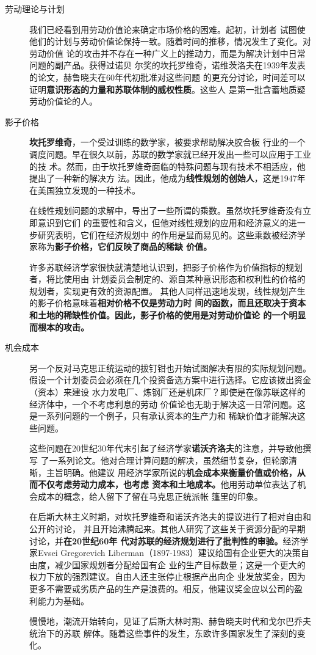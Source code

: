 \begin{description}
\item[劳动理论与计划] 我们已经看到用劳动价值论来确定市场价格的困难。起初，计划者
试图使他们的计划与劳动价值论保持一致。随着时间的推移，情况发生了变化。对劳动价值
论的攻击并不存在一种广义上的推动力，而是为解决计划中日常问题的副产品。获得过诺贝
尔奖的坎托罗维奇，诺维茨洛夫在1939年发表的论文，赫鲁晓夫在60年代初批准对这些问题
的更充分讨论，时间差可以证明\textbf{意识形态的力量和苏联体制的威权性质}。这些人
是第一批含蓄地质疑劳动价值论的人。

\item[影子价格] \textbf{坎托罗维奇}，一个受过训练的数学家，被要求帮助解决胶合板
行业的一个调度问题。早在很久以前，苏联的数学家就已经开发出一些可以应用于工业的技
术。然而，由于坎托罗维奇面临的特殊问题与现有技术不相适应，他提出了一种新的解决方
法。因此，他成为\textbf{线性规划的创始人}，这是1947年在美国独立发现的一种技术。

  在线性规划问题的求解中，导出了一些所谓的乘数。虽然坎托罗维奇没有立即意识到它们
的重要性和含义，但他对线性规划的应用和经济意义的进一步研究表明，它们在经济规划中
的作用是显而易见的。这些乘数被经济学家称为\textbf{影子价格，它们反映了商品的稀缺
价值。}

  许多苏联经济学家很快就清楚地认识到，把影子价格作为价值指标的规划者，将比使用由
计划委员会制定的、源自某种意识形态和权利性的价格的规划者，实现更有效的资源配置。
其他人同样迅速地发现，线性规划产生的影子价格意味着\textbf{相对价格不仅是劳动力时
间的函数，而且还取决于资本和土地的稀缺性价值。因此，影子价格的使用是对劳动价值论
的一个明显而根本的攻击。}

\item[机会成本] 另一个反对马克思正统运动的拔钉钳也开始试图解决有限的实际规划问题。
假设一个计划委员会必须在几个投资备选方案中进行选择。它应该拨出资金（资本）来建设
水力发电厂、炼钢厂还是机床厂？即使是在像苏联这样的经济体中，一个不考虑利息的劳动
价值论也无助于解决这一日常问题。这是一系列问题的一个例子，只有承认资本的生产力和
稀缺价值才能解决这些问题。

  这些问题在20世纪30年代末引起了经济学家\textbf{诺沃齐洛夫}的注意，并导致他撰写
了一系列论文。他对合理计算问题的解决，虽然细节复杂，但轮廓清晰，主旨明确。他建议
用经济学家所说的\textbf{机会成本来衡量价值或价格，从而不仅考虑劳动力成本，也考虑
资本和土地成本。}他用劳动单位表达了机会成本的概念，给人留下了留在马克思正统派帐
篷里的印象。

  在后斯大林主义时期，对坎托罗维奇和诺沃齐洛夫的提议进行了相对自由和公开的讨论，
并且开始沸腾起来。其他人研究了这些关于资源分配的早期讨论，并\textbf{在20世纪60年
代对苏联的经济规划进行了批判性的审验。}经济学家Evsei Gregorevich
Liberman（1897-1983）建议给国有企业更大的决策自由度，减少国家规划者分配给国有企
业的生产目标数量；这是一个更大的权力下放的强烈建议。自由人还主张停止根据产出向企
业发放奖金，因为更多不需要或劣质产品的生产是浪费的。相反，他建议奖金应以公司的盈
利能力为基础。

  慢慢地，潮流开始转向，见证了后斯大林时期、赫鲁晓夫时代和戈尔巴乔夫统治下的苏联
解体。随着这些事件的发生，东欧许多国家发生了深刻的变化。
\end{description}

